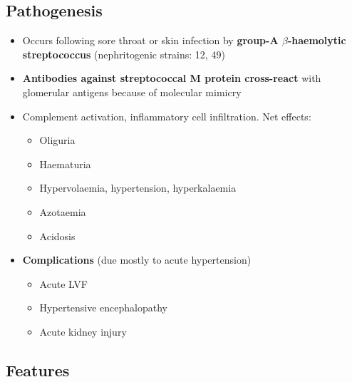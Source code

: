 \documentclass[
  12pt,
]{memoir}
\providecommand{\tightlist}{%
  \setlength{\itemsep}{0pt}\setlength{\parskip}{0pt}}
\begin{document}
\hypertarget{pathogenesis-2}{%
\subsection{Pathogenesis}\label{pathogenesis-2}}

\begin{itemize}
\tightlist
\item
  Occurs following sore throat or skin infection by \textbf{group-A
  \(\beta\)-haemolytic streptococcus} (nephritogenic strains: 12, 49)
\item
  \textbf{Antibodies against streptococcal M protein cross-react} with
  glomerular antigens because of molecular mimicry
\item
  Complement activation, inflammatory cell infiltration. Net effects:

  \begin{itemize}
  \tightlist
  \item
    Oliguria
  \item
    Haematuria
  \item
    Hypervolaemia, hypertension, hyperkalaemia
  \item
    Azotaemia
  \item
    Acidosis
  \end{itemize}
\item
  \textbf{Complications} (due mostly to acute hypertension)

  \begin{itemize}
  \tightlist
  \item
    Acute LVF
  \item
    Hypertensive encephalopathy
  \item
    Acute kidney injury
  \end{itemize}
\end{itemize}

\hypertarget{features-3}{%
\subsection{Features}\label{features-3}}
\end{document}

